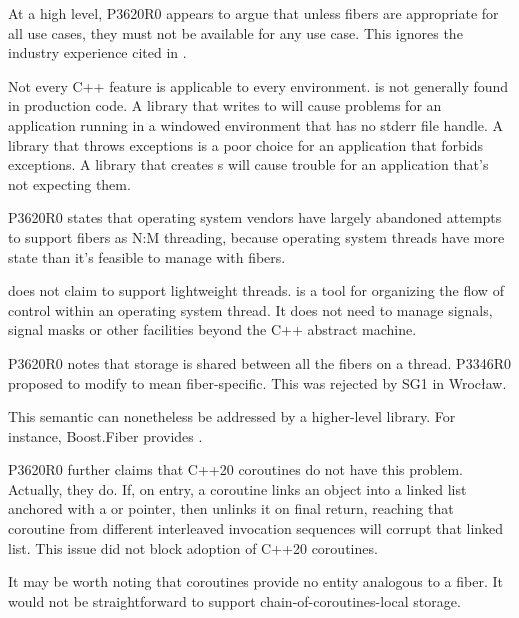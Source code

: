 
At a high level, P3620R0\cite{P3620R0} appears to argue that unless fibers are
appropriate for all use cases, they must not be available for any use case.
This ignores the industry experience cited in .

Not every C++ feature is applicable to every environment. 
is not generally found in production code. A library that writes to
 will cause problems for an application running in a windowed
environment that has no stderr file handle. A library that throws exceptions
is a poor choice for an application that forbids exceptions. A library that
creates s will cause trouble for an application that's not
expecting them.


P3620R0 states that operating system vendors have largely abandoned attempts
to support fibers as N:M threading, because operating system threads have more
state than it's feasible to manage with fibers.

\fiber does not claim to support lightweight threads. \fiber is a tool for
organizing the flow of control within an operating system thread. It does not
need to manage signals, signal masks or other facilities beyond the C++
abstract machine.


P3620R0 notes that \tlocal storage is shared between all the fibers on a
thread. P3346R0\cite{P3346R0} proposed to modify \tlocal to mean
fiber-specific. This was rejected by SG1 in Wrocław.\cite{wroclawp3346}

This semantic can nonetheless be addressed by a higher-level library. For
instance, Boost.Fiber\cite{bfiber} provides
\href{https://www.boost.org/doc/libs/release/libs/fiber/doc/html/fiber/fls.html}
{}.

P3620R0 further claims that C++20 coroutines do not have this problem.
Actually, they do. If, on entry, a coroutine links an object into a linked
list anchored with a  or \tlocal pointer, then unlinks it on final
return, reaching that coroutine from different interleaved invocation
sequences will corrupt that linked list. This issue did not block adoption
of C++20 coroutines.

It may be worth noting that coroutines provide no entity analogous to a fiber.
It would not be straightforward to support chain-of-coroutines-local storage.

